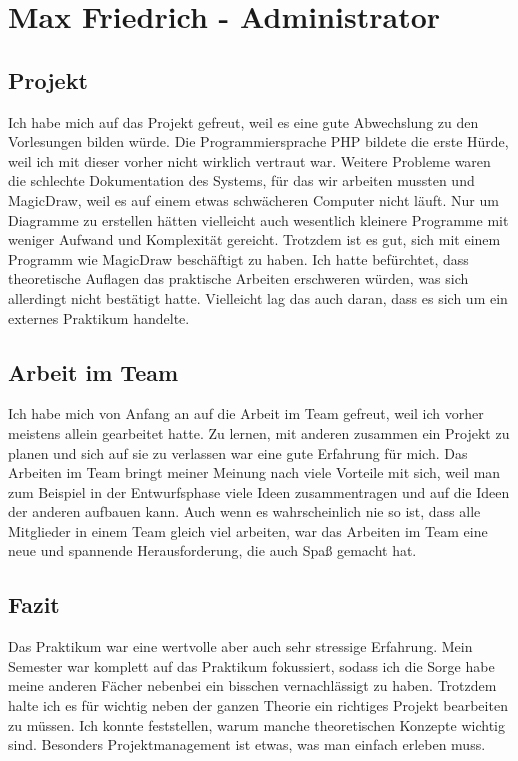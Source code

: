 \documentclass[a4paper]{scrreprt}
\begin{document}
\chapter{Max Friedrich - Administrator}

\section{Projekt}

Ich habe mich auf das Projekt gefreut, weil es eine gute Abwechslung zu den Vorlesungen bilden würde. Die Programmiersprache PHP bildete die erste Hürde, weil ich mit dieser vorher nicht wirklich vertraut war. Weitere Probleme waren die schlechte Dokumentation des Systems, für das wir arbeiten mussten und MagicDraw, weil es auf einem etwas schwächeren Computer nicht läuft. Nur um Diagramme zu erstellen hätten vielleicht auch wesentlich kleinere Programme mit weniger Aufwand und Komplexität gereicht. Trotzdem ist es gut, sich mit einem Programm wie MagicDraw beschäftigt zu haben.
Ich hatte befürchtet, dass theoretische Auflagen das praktische Arbeiten erschweren würden, was sich allerdingt nicht bestätigt hatte. Vielleicht lag das auch daran, dass es sich um ein externes Praktikum handelte. 

\section{Arbeit im Team}

Ich habe mich von Anfang an auf die Arbeit im Team gefreut, weil ich vorher meistens allein gearbeitet hatte. Zu lernen, mit anderen zusammen ein Projekt zu planen und sich auf sie zu verlassen war eine gute Erfahrung für mich. Das Arbeiten im Team bringt meiner Meinung nach viele Vorteile mit sich, weil man zum Beispiel in der Entwurfsphase viele Ideen zusammentragen und auf die Ideen der anderen aufbauen kann. 
Auch wenn es wahrscheinlich nie so ist, dass alle Mitglieder in einem Team gleich viel arbeiten, war das Arbeiten im Team eine neue und spannende Herausforderung, die auch Spaß gemacht hat. 

\section{Fazit}

Das Praktikum war eine wertvolle aber auch sehr stressige Erfahrung. Mein Semester war komplett auf das Praktikum fokussiert, sodass ich die Sorge habe meine anderen Fächer nebenbei ein bisschen vernachlässigt zu haben. Trotzdem halte ich es für wichtig neben der ganzen Theorie ein richtiges Projekt bearbeiten zu müssen. Ich konnte feststellen, warum manche theoretischen Konzepte wichtig sind. Besonders Projektmanagement ist etwas, was man einfach erleben muss.
\end{document}
